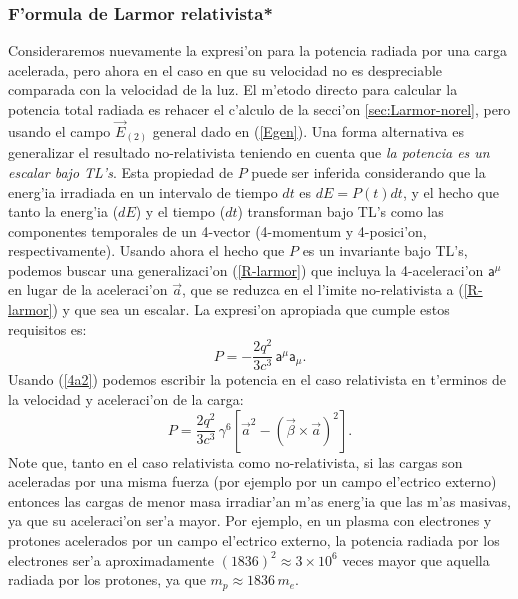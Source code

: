 \subsubsection{F'ormula de Larmor relativista*}
Consideraremos nuevamente la expresi'on para la potencia radiada por una carga acelerada, pero ahora en el caso en que su velocidad no es despreciable comparada con la velocidad de la luz. El m'etodo directo para calcular la
potencia total radiada es rehacer el c'alculo de la secci'on \ref{sec:Larmor-norel}, pero usando el campo $\vec{E}_{(2)}$ general dado en (\ref{Egen}). Una forma
alternativa es generalizar el resultado no-relativista teniendo en cuenta que
\textit{la potencia es un escalar bajo TL's}. Esta propiedad de $P$ puede ser
inferida considerando que la energ'ia irradiada en un intervalo de tiempo $dt$
es $dE=P(t)dt$, y el hecho que tanto la energ'ia ($dE$) y el tiempo ($dt$)
transforman bajo TL's como las componentes temporales de un 4-vector
(4-momentum y 4-posici'on, respectivamente). Usando ahora el hecho que $P$
es un invariante bajo TL's, podemos buscar una generalizaci'on (\ref{R-larmor})
que incluya la 4-aceleraci'on $\mathsf{a}^\mu$ en lugar de la aceleraci'on
$\vec{a}$, que se reduzca en el l'imite no-relativista a (\ref{R-larmor}) y que
sea un escalar. La expresi'on apropiada que cumple estos requisitos es:
\begin{equation}
\boxed{P=-\frac{2q^2}{3c^3}\,\mathsf{a}^\mu\mathsf{a}_\mu.}\label{R-larmor-rel}%
\end{equation}
Usando (\ref{4a2}) podemos escribir la potencia en el caso
relativista en t'erminos de la velocidad y aceleraci'on de la carga:
\begin{equation}
\boxed{P=\frac{2q^2}{3c^3}\,\gamma^6\left[ \vec{a}^2-\left(\vec{\beta}\times\vec{a}\right)^2\right] .}\label{R-larmor2}%
\end{equation}
Note que, tanto en el caso relativista como no-relativista, si las cargas son
aceleradas por una misma fuerza (por ejemplo por un campo el'ectrico externo)
entonces las cargas de menor masa irradiar'an m'as energ'ia que las m'as
masivas, ya que su aceleraci'on ser'a mayor. Por ejemplo, en un plasma con
electrones y protones acelerados por un campo el'ectrico externo, la potencia
radiada por los electrones ser'a aproximadamente $(1836)^2\approx 3\times
10^{6}$ veces mayor que aquella radiada por los protones, ya que $m_p\approx
1836\,m_e$.

